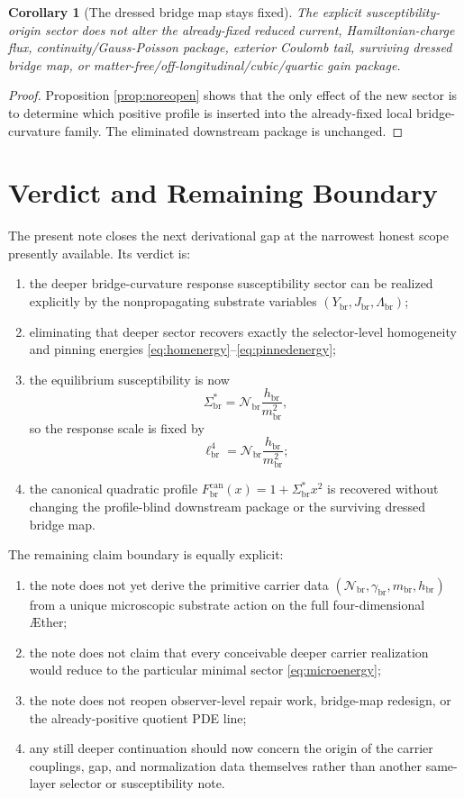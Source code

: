 \documentclass[11pt]{article}
\newcommand{\Aether}{\AE{}ther}
\newcommand{\CurvScale}{\ell_{\mathrm{br}}}
\newcommand{\CurvProfileCan}{F_{\mathrm{br}}^{\mathrm{can}}}
\newcommand{\RespSusEq}{\Sigma_{\mathrm{br}}^{\ast}}
\newcommand{\RespCarrier}{Y_{\mathrm{br}}}
\newcommand{\RespFlux}{J_{\mathrm{br}}}
\newcommand{\RespCompat}{\Lambda_{\mathrm{br}}}
\newcommand{\RespNorm}{\mathcal N_{\mathrm{br}}}
\newcommand{\RespFluxCoeff}{\gamma_{\mathrm{br}}}
\newcommand{\RespGap}{m_{\mathrm{br}}}
\newcommand{\RespBias}{h_{\mathrm{br}}}
\newtheorem{corollary}{Corollary}
\begin{document}
\begin{corollary}[The dressed bridge map stays fixed]
\label{cor:dressedfixed}
The explicit susceptibility-origin sector does not alter the already-fixed reduced current, Hamiltonian-charge flux, continuity/Gauss-Poisson package, exterior Coulomb tail, surviving dressed bridge map, or matter-free/off-longitudinal/cubic/quartic gain package.
\end{corollary}

\begin{proof}
Proposition \ref{prop:noreopen} shows that the only effect of the new sector is to determine which positive profile is inserted into the already-fixed local bridge-curvature family. The eliminated downstream package is unchanged.
\end{proof}

\section{Verdict and Remaining Boundary}

The present note closes the next derivational gap at the narrowest honest scope presently available. Its verdict is:
\begin{enumerate}
    \item the deeper bridge-curvature response susceptibility sector can be realized explicitly by the nonpropagating substrate variables \((\RespCarrier,\RespFlux,\RespCompat)\);
    \item eliminating that deeper sector recovers exactly the selector-level homogeneity and pinning energies \eqref{eq:homenergy}--\eqref{eq:pinnedenergy};
    \item the equilibrium susceptibility is now
    \[
    \RespSusEq=\RespNorm\frac{\RespBias}{\RespGap^2},
    \]
    so the response scale is fixed by
    \[
    \CurvScale^4=\RespNorm\frac{\RespBias}{\RespGap^2};
    \]
    \item the canonical quadratic profile \(\CurvProfileCan(x)=1+\RespSusEq x^2\) is recovered without changing the profile-blind downstream package or the surviving dressed bridge map.
\end{enumerate}

The remaining claim boundary is equally explicit:
\begin{enumerate}
    \item the note does not yet derive the primitive carrier data \((\RespNorm,\RespFluxCoeff,\RespGap,\RespBias)\) from a unique microscopic substrate action on the full four-dimensional \Aether{};
    \item the note does not claim that every conceivable deeper carrier realization would reduce to the particular minimal sector \eqref{eq:microenergy};
    \item the note does not reopen observer-level repair work, bridge-map redesign, or the already-positive quotient PDE line;
    \item any still deeper continuation should now concern the origin of the carrier couplings, gap, and normalization data themselves rather than another same-layer selector or susceptibility note.
\end{enumerate}
\end{document}
